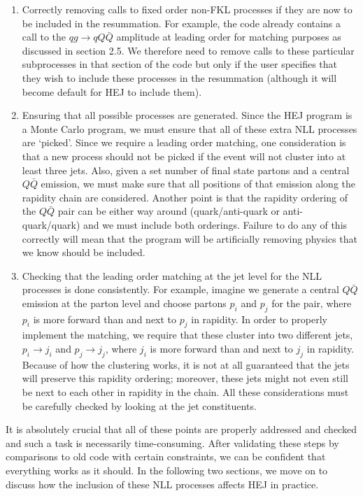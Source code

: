 \begin{enumerate}
\item{Correctly removing calls to fixed order non-FKL processes if they are now to be included in the resummation. For example, the code already contains a call to the $qg \to qQ\bar{Q}$ amplitude at leading order for matching purposes as discussed in section 2.5. We therefore need to remove calls to these particular subprocesses in that section of the code but only if the user specifies that they wish to include these processes in the resummation (although it will become default for HEJ to include them). }
\item{Ensuring that all possible processes are generated. Since the HEJ program is a Monte Carlo program, we must ensure that all of these extra NLL processes are `picked'. Since we require a leading order matching, one consideration is that a new process should not be picked if the event will not cluster into at least three jets. Also, given a set number of final state partons and a central $Q\bar{Q}$ emission, we must make sure that all positions of that emission along the rapidity chain are considered. Another point is that the rapidity ordering of the $Q\bar{Q}$ pair can be either way around (quark/anti-quark or anti-quark/quark) and we must include both orderings. Failure to do any of this correctly will mean that the program will be artificially removing physics that we know should be included.}
\item{Checking that the leading order matching at the jet level for the NLL processes is done consistently. For example, imagine we generate a central $Q\bar{Q}$ emission at the parton level and choose partons $p_i$ and $p_j$ for the pair, where $p_i$ is more forward than and next to $p_j$ in rapidity. In order to properly implement the matching, we require that these cluster into two different jets, $p_i \to j_i$ and $p_j \to j_j$, where $j_i$ is more forward than and next to $j_j$ in rapidity. Because of how the clustering works, it is not at all guaranteed that the jets will preserve this rapidity ordering; moreover, these jets might not even still be next to each other in rapidity in the chain. All these considerations must be carefully checked by looking at the jet constituents.}
\end{enumerate} 
It is absolutely crucial that all of these points are properly addressed and checked and such a task is necessarily time-consuming. After validating these steps by comparisons to old code with certain constraints, we can be confident that everything works as it should. In the following two sections, we move on to discuss how the inclusion of these NLL processes affects HEJ in practice. 


